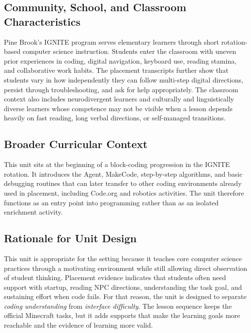 \documentclass[12pt]{article}
\begin{document}
\subsection{Community, School, and Classroom Characteristics}

Pine Brook's IGNITE program serves elementary learners through short rotation-based computer science instruction. Students enter the classroom with uneven prior experiences in coding, digital navigation, keyboard use, reading stamina, and collaborative work habits. The placement transcripts further show that students vary in how independently they can follow multi-step digital directions, persist through troubleshooting, and ask for help appropriately. The classroom context also includes neurodivergent learners and culturally and linguistically diverse learners whose competence may not be visible when a lesson depends heavily on fast reading, long verbal directions, or self-managed transitions.

\subsection{Broader Curricular Context}

This unit sits at the beginning of a block-coding progression in the IGNITE rotation. It introduces the Agent, MakeCode, step-by-step algorithms, and basic debugging routines that can later transfer to other coding environments already used in placement, including Code.org and robotics activities. The unit therefore functions as an entry point into programming rather than as an isolated enrichment activity.

\subsection{Rationale for Unit Design}

This unit is appropriate for the setting because it teaches core computer science practices through a motivating environment while still allowing direct observation of student thinking. Placement evidence indicates that students often need support with startup, reading NPC directions, understanding the task goal, and sustaining effort when code fails. For that reason, the unit is designed to separate \emph{coding understanding} from \emph{interface difficulty}. The lesson sequence keeps the official Minecraft tasks, but it adds supports that make the learning goals more reachable and the evidence of learning more valid.
\end{document}
